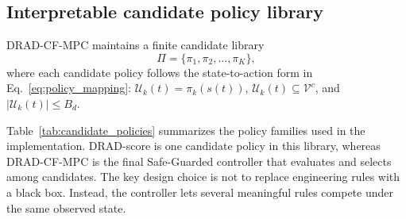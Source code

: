 \documentclass[lettersize,journal]{IEEEtran}
\begin{document}
\subsection{Interpretable candidate policy library}
\label{subsec:candidate_policy}

DRAD-CF-MPC maintains a finite candidate library
\begin{equation}
    \Pi=\{\pi_1,\pi_2,\ldots,\pi_K\},
    \label{eq:policy_library}
\end{equation}
where each candidate policy follows the state-to-action form in Eq.~\eqref{eq:policy_mapping}: $\mathcal{U}_k(t)=\pi_k(s(t))$, $\mathcal{U}_k(t)\subseteq\mathcal{V}^{c}$, and $|\mathcal{U}_k(t)|\leq B_d$.

Table~\ref{tab:candidate_policies} summarizes the policy families used in the implementation. DRAD-score is one candidate policy in this library, whereas DRAD-CF-MPC is the final Safe-Guarded controller that evaluates and selects among candidates. The key design choice is not to replace engineering rules with a black box. Instead, the controller lets several meaningful rules compete under the same observed state.
\end{document}
